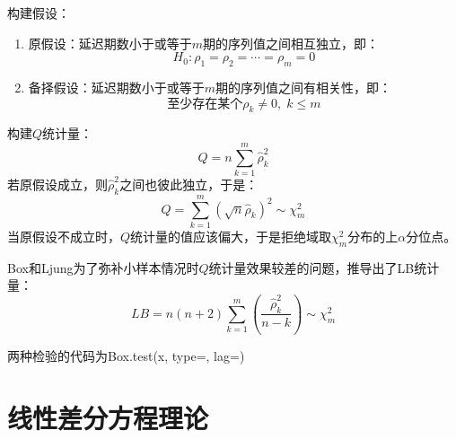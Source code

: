 \begin{derivation}
	构建假设：
	\begin{enumerate}
		\item 原假设：延迟期数小于或等于$m$期的序列值之间相互独立，即：
		\begin{equation*}
			H_0:\rho_1=\rho_2=\cdots=\rho_m=0
		\end{equation*}
		\item 备择假设：延迟期数小于或等于$m$期的序列值之间有相关性，即：
		\begin{equation*}
			\text{至少存在某个}\rho_k\ne0,\;k\leqslant m
		\end{equation*}
	\end{enumerate}
	构建$Q$统计量：
	\begin{equation*}
		Q=n\sum_{k=1}^{m}\hat{\rho}_k^2
	\end{equation*}
	若原假设成立，则$\hat{\rho}_k^2$之间也彼此独立，于是：
	\begin{equation*}
		Q=\sum_{k=1}^{m}(\sqrt{n}\hat{\rho}_k)^2\sim\chi^2_m
	\end{equation*}
	当原假设不成立时，$Q$统计量的值应该偏大，于是拒绝域取$\chi^2_m$分布的上$\alpha$分位点。\par
	Box和Ljung为了弥补小样本情况时$Q$统计量效果较差的问题，推导出了LB统计量：
	\begin{equation*}
		LB=n(n+2)\sum_{k=1}^{m}\left(\frac{\hat{\rho}_k^2}{n-k}\right)\sim\chi^2_m
	\end{equation*}\par
	两种检验的代码为Box.test(x, type=, lag=)
\end{derivation}

\section{线性差分方程理论}

